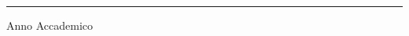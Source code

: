 \begin{titlepage}
    \vspace*{5mm}

    \rule{0.8\textwidth}{0.4pt}
    \begin{center}
    {\fontsize{17}{17}\selectfont 
        Anno Accademico \tesiAA
    }
    \end{center}

\end{titlepage}
\restoregeometry

\leavevmode\thispagestyle{empty}\newpage